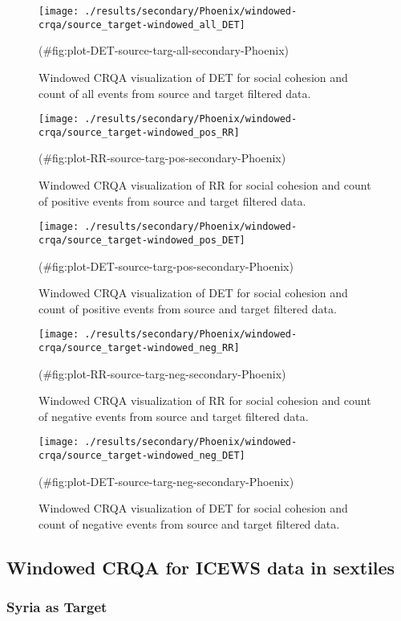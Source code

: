 \begin{appendix}
\begin{figure}
\texttt{[image: ./results/secondary/Phoenix/windowed-crqa/source\_target-windowed\_all\_DET]} \caption{Windowed CRQA visualization of DET for social cohesion and count of all events from source and target filtered data.}(\#fig:plot-DET-source-targ-all-secondary-Phoenix)
\end{figure}

\begin{figure}
\texttt{[image: ./results/secondary/Phoenix/windowed-crqa/source\_target-windowed\_pos\_RR]} \caption{Windowed CRQA visualization of RR for social cohesion and count of positive events from source and target filtered data.}(\#fig:plot-RR-source-targ-pos-secondary-Phoenix)
\end{figure}

\begin{figure}
\texttt{[image: ./results/secondary/Phoenix/windowed-crqa/source\_target-windowed\_pos\_DET]} \caption{Windowed CRQA visualization of DET for social cohesion and count of positive events from source and target filtered data.}(\#fig:plot-DET-source-targ-pos-secondary-Phoenix)
\end{figure}

\begin{figure}
\texttt{[image: ./results/secondary/Phoenix/windowed-crqa/source\_target-windowed\_neg\_RR]} \caption{Windowed CRQA visualization of RR for social cohesion and count of negative events from source and target filtered data.}(\#fig:plot-RR-source-targ-neg-secondary-Phoenix)
\end{figure}

\begin{figure}
\texttt{[image: ./results/secondary/Phoenix/windowed-crqa/source\_target-windowed\_neg\_DET]} \caption{Windowed CRQA visualization of DET for social cohesion and count of negative events from source and target filtered data.}(\#fig:plot-DET-source-targ-neg-secondary-Phoenix)
\end{figure}

\hypertarget{windowed-crqa-for-icews-data-in-sextiles}{%
\subsection{Windowed CRQA for ICEWS data in
sextiles}\label{windowed-crqa-for-icews-data-in-sextiles}}

\hypertarget{syria-as-target-1}{%
\subsubsection{Syria as Target}\label{syria-as-target-1}}


\end{appendix}
